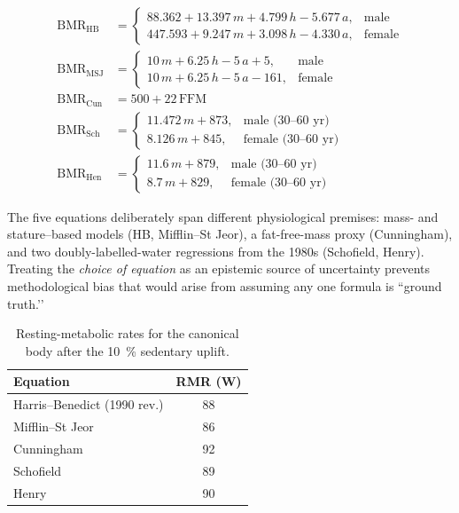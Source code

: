 \begin{subequations}\label{eq:BMR}
\begin{align}
\mathrm{BMR}_{\text{HB}} &=
  \begin{cases}
     88.362 + 13.397\,m + 4.799\,h - 5.677\,a, & \text{male}\\
    447.593 +  9.247\,m + 3.098\,h - 4.330\,a, & \text{female}
  \end{cases}
  \tag{\theequation a}\label{eq:BMR_HB}\\[4pt]
\mathrm{BMR}_{\text{MSJ}} &=
  \begin{cases}
    10\,m + 6.25\,h - 5\,a + 5,   & \text{male}\\
    10\,m + 6.25\,h - 5\,a - 161, & \text{female}
  \end{cases}
  \tag{\theequation b}\label{eq:BMR_MSJ}\\[4pt]
\mathrm{BMR}_{\text{Cun}} &= 500 + 22\,\mathrm{FFM}
  \tag{\theequation c}\label{eq:BMR_Cun}\\[4pt]
\mathrm{BMR}_{\text{Sch}} &=
  \begin{cases}
    11.472\,m + 873, & \text{male (30--60 yr)}\\
     8.126\,m + 845, & \text{female (30--60 yr)}
  \end{cases}
  \tag{\theequation d}\label{eq:BMR_Sch}\\[4pt]
\mathrm{BMR}_{\text{Hen}} &=
  \begin{cases}
    11.6\,m + 879, & \text{male (30--60 yr)}\\
     8.7\,m + 829, & \text{female (30--60 yr)}
  \end{cases}
  \tag{\theequation e}\label{eq:BMR_Hen}
\end{align}
\end{subequations}

\noindent
The five equations deliberately span different physiological premises:
mass- and stature–based models (HB, Mifflin–St Jeor), a fat-free-mass proxy
(Cunningham), and two doubly-labelled-water regressions from the 1980s
(Schofield, Henry).  Treating the \emph{choice of equation} as an epistemic
source of uncertainty prevents methodological bias that would arise from
assuming any one formula is ``ground truth.’’

\begin{table}[htbp]
\centering
\caption{Resting-metabolic rates for the canonical body after the
\SI{10}{\percent} sedentary uplift.}
\label{tab:eq_only}
\begin{tabular}{lc}
\toprule
Equation & RMR (W) \\
\midrule
Harris–Benedict (1990 rev.) & 88 \\
Mifflin–St Jeor            & 86 \\
Cunningham                 & 92 \\
Schofield                  & 89 \\
Henry                      & 90 \\
\bottomrule
\end{tabular}
\end{table}

